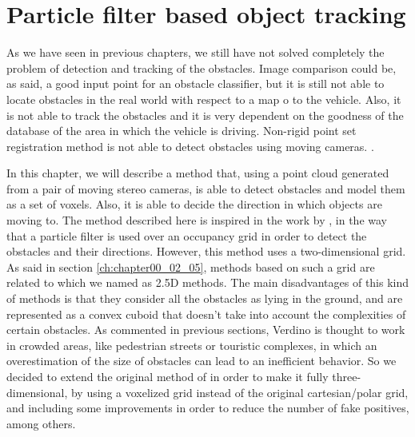 
\graphicspath{{./images/chapter05/bmps/}{./images/chapter05/vects/}{./images/chapter05/}}

\chapter{Particle filter based object tracking}\label{ch:chapter05}

As we have seen in previous chapters, we still have not solved completely the problem of detection and tracking of the obstacles. Image comparison could be, as said, a good input point for an obstacle classifier, but it is still not able to locate obstacles in the real world with respect to a map o to the vehicle. Also, it is not able to track the obstacles and it is very dependent on the goodness of the database of the area in which the vehicle is driving. Non-rigid point set registration method is not able to detect obstacles using moving cameras. . 

In this chapter, we will describe a method that, using a point cloud generated from a pair of moving stereo cameras, is able to detect obstacles and model them as a set of voxels. Also, it is able to decide the direction in which objects are moving to. The method described here is inspired in the work by \cite{danescu2012particle}, in the way that a particle filter is used over an occupancy grid in order to detect the obstacles and their directions. However, this method uses a two-dimensional grid. As said in section \ref{ch:chapter00_02_05}, methods based on such a grid are related to which we named as 2.5D methods. The main disadvantages of this kind of methods is that they consider all the obstacles as lying in the ground, and are represented as a convex cuboid that doesn't take into account the complexities of certain obstacles.
As commented in previous sections, Verdino is thought to work in crowded areas, like pedestrian streets or touristic complexes, in which an overestimation of the size of obstacles can lead to an inefficient behavior. So we decided to extend the original method of \cite{danescu2012particle} in order to make it fully three-dimensional, by using a voxelized grid instead of the original cartesian/polar grid, and including some improvements in order to reduce the number of fake positives, among others.

